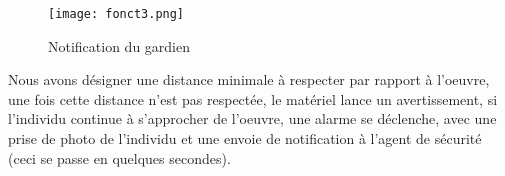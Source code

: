     \begin{figure}[h]
        \centering
        \texttt{[image: fonct3.png]}
        \caption{Notification du gardien}
        \label{fig:fonct3}
    \end{figure}
    
    Nous avons désigner une distance minimale à respecter par rapport à l'oeuvre, une fois cette distance n'est pas respectée, le matériel lance un avertissement, si l'individu continue à s'approcher de l'oeuvre, une alarme se déclenche, avec une prise de photo de l'individu et une envoie de notification à l'agent de sécurité (ceci se passe en quelques secondes).